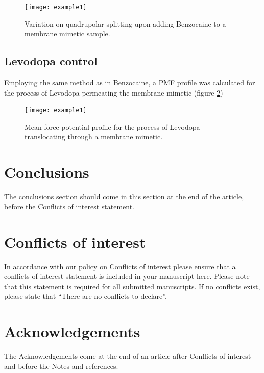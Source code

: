 \documentclass[9pt]{article}
\renewcommand{\refname}{Notes and references}
\begin{document}
\begin{figure}[h]
\centering
  \texttt{[image: example1]}
  \caption{Variation on quadrupolar splitting upon adding Benzocaine to a
    membrane mimetic sample.}
  \label{fig:sds_benzocaine}
\end{figure}

\subsection{Levodopa control}
\label{sec:ldopa}

Employing the same method as in Benzocaine, a PMF profile was calculated for the
process of Levodopa permeating the membrane mimetic (figure \ref{fig:levodopa_profile})

\begin{figure}[h]
\centering
  \texttt{[image: example1]}
  \caption{Mean force potential profile for the process of Levodopa
    translocating through a membrane mimetic.}
  \label{fig:levodopa_profile}
\end{figure}

\section{Conclusions}
The conclusions section should come in this section at the end of the article,
before the Conflicts of interest statement.

\section*{Conflicts of interest}
In accordance with our policy on
\href{http://www.rsc.org/journals-books-databases/journal-authors-reviewers/author-responsibilities/#code-of-conduct}{Conflicts
  of interest} please ensure that a conflicts of interest statement is included
in your manuscript here. Please note that this statement is required for all
submitted manuscripts. If no conflicts exist, please state that ``There are no
conflicts to declare''.

\section*{Acknowledgements}
The Acknowledgements come at the end of an article after Conflicts of interest
and before the Notes and references.



\balance


\end{document}
